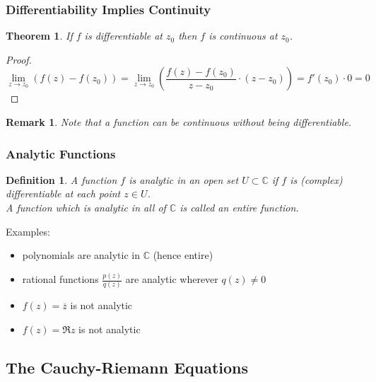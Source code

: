 \documentclass{article}
\newtheorem{theorem}{Theorem}[section]
\newtheorem*{remark}{Remark}
\newtheorem{definition}{Definition}[section]
\begin{document}
\subsubsection{Differentiability Implies Continuity}
\begin{theorem}
If $f$ is differentiable at $z_0$ then $f$ is continuous at $z_0$.
\end{theorem}
\begin{proof}
\begin{equation*}
\lim_{z \to z_0} (f(z) - f(z_0)) = \lim_{z \to z_0} (\frac{f(z) - f(z_0)}{z - z_0} \cdot (z - z_0)) = f'(z_0) \cdot 0 = 0
\end{equation*}
\end{proof}
\begin{remark}
Note that a function can be continuous without being differentiable.
\end{remark}

\subsubsection{Analytic Functions}
\begin{definition}
A function $f$ is analytic in an open set $U \subset \mathbb{C}$ if $f$ is (complex) differentiable at each point $z \in U$. \\
A function which is analytic in all of $\mathbb{C}$ is called an entire function.
\end{definition}
Examples:
\begin{itemize}
\item polynomials are analytic in $\mathbb{C}$ (hence entire)
\item rational functions $\frac{p(z)}{q(z)}$ are analytic wherever $q(z) \neq 0$
\item $f(z) = \overline{z}$ is not analytic
\item $f(z) = \Re z$ is not analytic
\end{itemize}

\subsection{The Cauchy-Riemann Equations}
\end{document}
